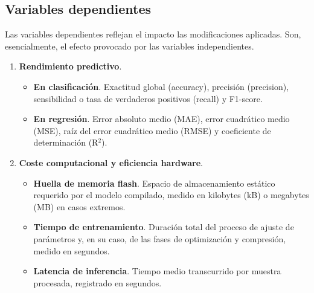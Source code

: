 \documentclass[a4paper,12pt,twoside,final]{book}
\begin{document}
\subsection{Variables dependientes}
Las variables dependientes reflejan el impacto las modificaciones aplicadas. Son, esencialmente, el efecto provocado
por las variables independientes.
\begin{enumerate}
  \item \textbf{Rendimiento predictivo}.
  \begin{itemize}
    \item \textbf{En clasificación}. Exactitud global (accuracy), precisión (precision), sensibilidad o tasa de
    verdaderos positivos (recall) y F1-score.
    \item \textbf{En regresión}. Error absoluto medio (MAE), error cuadrático medio (MSE), raíz del error cuadrático
    medio (RMSE) y coeficiente de determinación (R$^2$).
  \end{itemize}

  \item \textbf{Coste computacional y eficiencia hardware}.
  \begin{itemize}
    \item \textbf{Huella de memoria flash}. Espacio de almacenamiento estático requerido por el modelo compilado,
    medido en kilobytes (kB) o megabytes (MB) en casos extremos.
    \item \textbf{Tiempo de entrenamiento}. Duración total del proceso de ajuste de parámetros y, en su caso, de las
    fases de optimización y compresión, medido en segundos.
    \item \textbf{Latencia de inferencia}. Tiempo medio transcurrido por muestra procesada, registrado en segundos.
  \end{itemize}
\end{enumerate}
\end{document}
